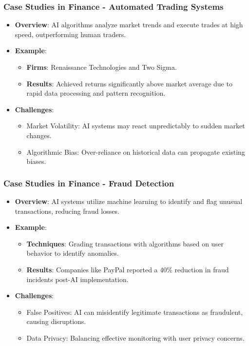 \documentclass[aspectratio=169]{beamer}
\begin{document}
\begin{frame}[fragile]
    \frametitle{Case Studies in Finance - Automated Trading Systems}
    \begin{itemize}
        \item \textbf{Overview}: AI algorithms analyze market trends and execute trades at high speed, outperforming human traders.
        \item \textbf{Example}:
        \begin{itemize}
            \item \textbf{Firms}: Renaissance Technologies and Two Sigma.
            \item \textbf{Results}: Achieved returns significantly above market average due to rapid data processing and pattern recognition.
        \end{itemize}
        \item \textbf{Challenges}:
        \begin{itemize}
            \item Market Volatility: AI systems may react unpredictably to sudden market changes.
            \item Algorithmic Bias: Over-reliance on historical data can propagate existing biases.
        \end{itemize}
    \end{itemize}
\end{frame}

\begin{frame}[fragile]
    \frametitle{Case Studies in Finance - Fraud Detection}
    \begin{itemize}
        \item \textbf{Overview}: AI systems utilize machine learning to identify and flag unusual transactions, reducing fraud losses.
        \item \textbf{Example}:
        \begin{itemize}
            \item \textbf{Techniques}: Grading transactions with algorithms based on user behavior to identify anomalies.
            \item \textbf{Results}: Companies like PayPal reported a 40\% reduction in fraud incidents post-AI implementation.
        \end{itemize}
        \item \textbf{Challenges}:
        \begin{itemize}
            \item False Positives: AI can misidentify legitimate transactions as fraudulent, causing disruptions.
            \item Data Privacy: Balancing effective monitoring with user privacy concerns.
        \end{itemize}
    \end{itemize}
\end{frame}
\end{document}
